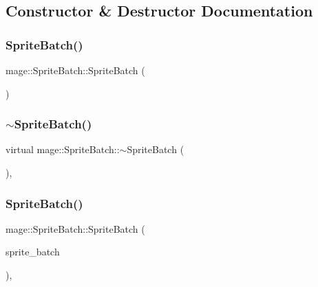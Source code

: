 \subsection{Constructor \& Destructor Documentation}
\hypertarget{classmage_1_1_sprite_batch_a75924326627c792ff454d9d2a2ba1fda}{}\label{classmage_1_1_sprite_batch_a75924326627c792ff454d9d2a2ba1fda} 
\subsubsection{\texorpdfstring{Sprite\+Batch()}{SpriteBatch()}\hspace{0.1cm}{\footnotesize\ttfamily [1/2]}}
{\footnotesize\ttfamily mage\+::\+Sprite\+Batch\+::\+Sprite\+Batch (\begin{DoxyParamCaption}{ }\end{DoxyParamCaption})}

\hypertarget{classmage_1_1_sprite_batch_ab0e2b5af638de0a6a3bbcf2bba6c730a}{}\label{classmage_1_1_sprite_batch_ab0e2b5af638de0a6a3bbcf2bba6c730a} 
\subsubsection{\texorpdfstring{$\sim$\+Sprite\+Batch()}{~SpriteBatch()}}
{\footnotesize\ttfamily virtual mage\+::\+Sprite\+Batch\+::$\sim$\+Sprite\+Batch (\begin{DoxyParamCaption}{ }\end{DoxyParamCaption})\hspace{0.3cm}{\ttfamily [virtual]}, {\ttfamily [default]}}

\hypertarget{classmage_1_1_sprite_batch_a10fe1d6cf1d2de9e087b370e7d696be8}{}\label{classmage_1_1_sprite_batch_a10fe1d6cf1d2de9e087b370e7d696be8} 
\subsubsection{\texorpdfstring{Sprite\+Batch()}{SpriteBatch()}\hspace{0.1cm}{\footnotesize\ttfamily [2/2]}}
{\footnotesize\ttfamily mage\+::\+Sprite\+Batch\+::\+Sprite\+Batch (\begin{DoxyParamCaption}\item[{const \hyperlink{classmage_1_1_sprite_batch}{Sprite\+Batch} \&}]{sprite\+\_\+batch }\end{DoxyParamCaption})\hspace{0.3cm}{\ttfamily [private]}, {\ttfamily [delete]}}



